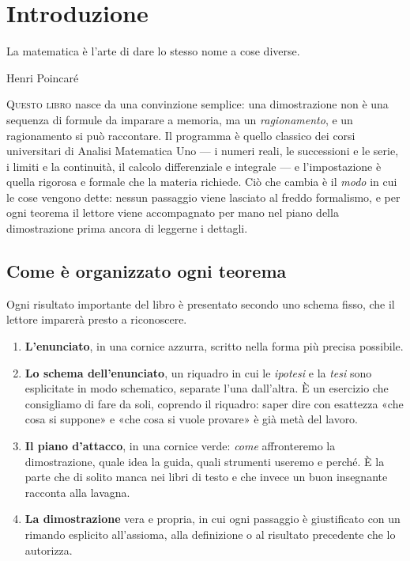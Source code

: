 \chapter*{Introduzione}
\AddToShipoutPictureBG*{\AtPageLowerLeft{\margingardengrown}}

\epigraph{La matematica è l'arte di dare lo stesso nome a cose diverse.}{Henri Poincaré}

\lettrine[lines=3, findent=2pt, nindent=0pt]{Q}{uesto libro} nasce da una convinzione
semplice: una dimostrazione non è una sequenza di formule da imparare a memoria, ma un
\emph{ragionamento}, e un ragionamento si può raccontare. Il programma è quello classico
dei corsi universitari di Analisi Matematica Uno --- i numeri reali, le successioni e le
serie, i limiti e la continuità, il calcolo differenziale e integrale --- e l'impostazione
è quella rigorosa e formale che la materia richiede. Ciò che cambia è il \emph{modo} in cui
le cose vengono dette: nessun passaggio viene lasciato al freddo formalismo, e per ogni
teorema il lettore viene accompagnato per mano nel piano della dimostrazione prima ancora
di leggerne i dettagli.

\section*{Come è organizzato ogni teorema}

Ogni risultato importante del libro è presentato secondo uno schema fisso, che il
lettore imparerà presto a riconoscere.

\begin{enumerate}[label=\textbf{\arabic*.}]
  \item \textbf{L'enunciato}, in una cornice azzurra, scritto nella forma più precisa
  possibile.
  \item \textbf{Lo schema dell'enunciato}, un riquadro in cui le \emph{ipotesi} e la
  \emph{tesi} sono esplicitate in modo schematico, separate l'una dall'altra. È un
  esercizio che consigliamo di fare da soli, coprendo il riquadro: saper dire con
  esattezza «che cosa si suppone» e «che cosa si vuole provare» è già metà del lavoro.
  \item \textbf{Il piano d'attacco}, in una cornice verde: \emph{come} affronteremo la
  dimostrazione, quale idea la guida, quali strumenti useremo e perché. È la parte che di
  solito manca nei libri di testo e che invece un buon insegnante racconta alla lavagna.
  \item \textbf{La dimostrazione} vera e propria, in cui ogni passaggio è giustificato con
  un rimando esplicito all'assioma, alla definizione o al risultato precedente che lo
  autorizza.
\end{enumerate}

